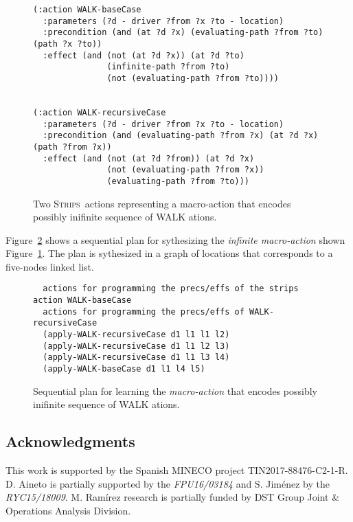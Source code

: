 \documentclass[letterpaper]{article} %
\newcommand{\strips}{\textsc{Strips}}     %
\begin{document}
\begin{figure}
  \begin{tiny}
  \begin{verbatim}
(:action WALK-baseCase
  :parameters (?d - driver ?from ?x ?to - location)
  :precondition (and (at ?d ?x) (evaluating-path ?from ?to) (path ?x ?to))
  :effect (and (not (at ?d ?x)) (at ?d ?to)
               (infinite-path ?from ?to)
               (not (evaluating-path ?from ?to))))


(:action WALK-recursiveCase
  :parameters (?d - driver ?from ?x ?to - location)
  :precondition (and (evaluating-path ?from ?x) (at ?d ?x) (path ?from ?x))
  :effect (and (not (at ?d ?from)) (at ?d ?x)
               (not (evaluating-path ?from ?x))
               (evaluating-path ?from ?to))) 
  \end{verbatim}
  \end{tiny}
 \caption{Two \strips\ actions representing a macro-action that encodes possibly inifinite sequence of WALK ations.}
   \label{fig:infinite-macro2}
\end{figure}



Figure~\ref{fig:plan} shows a sequential plan for sythesizing the {\em infinite macro-action} shown Figure~\ref{fig:infinite-macro2}. The plan is sythesized in a graph of locations that corresponds to a five-nodes linked list.
\begin{figure}
  \begin{tiny}
  \begin{verbatim}
  actions for programming the precs/effs of the strips action WALK-baseCase
  actions for programming the precs/effs of WALK-recursiveCase
  (apply-WALK-recursiveCase d1 l1 l1 l2)  
  (apply-WALK-recursiveCase d1 l1 l2 l3)  
  (apply-WALK-recursiveCase d1 l1 l3 l4)
  (apply-WALK-baseCase d1 l1 l4 l5)  
  \end{verbatim}
  \end{tiny}
 \caption{Sequential plan for learning the {\em macro-action} that encodes possibly inifinite sequence of WALK ations.}
   \label{fig:plan}
\end{figure}


\subsection*{Acknowledgments}
This work is supported by the Spanish MINECO project TIN2017-88476-C2-1-R. D. Aineto is partially supported by the {\it FPU16/03184} and S. Jim\'enez by the {\it RYC15/18009}. M. Ram\'irez research is partially funded by DST Group Joint \& Operations Analysis Division.



\end{document}
